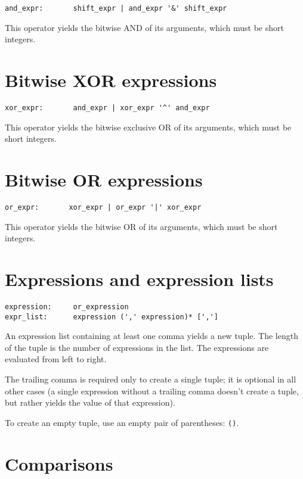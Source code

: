 \begin{verbatim}
and_expr:       shift_expr | and_expr '&' shift_expr
\end{verbatim}

This operator yields the bitwise AND of its arguments,
which must be short integers.

\section{Bitwise XOR expressions}

\begin{verbatim}
xor_expr:       and_expr | xor_expr '^' and_expr
\end{verbatim}

This operator yields the bitwise exclusive OR of its arguments,
which must be short integers.

\section{Bitwise OR expressions}

\begin{verbatim}
or_expr:       xor_expr | or_expr '|' xor_expr
\end{verbatim}

This operator yields the bitwise OR of its arguments,
which must be short integers.

\section{Expressions and expression lists}

\begin{verbatim}
expression:     or_expression
expr_list:      expression (',' expression)* [',']
\end{verbatim}

An expression list containing at least one comma yields a new tuple.
The length of the tuple is the number of expressions in the list.
The expressions are evaluated from left to right.

The trailing comma is required only to create a single tuple;
it is optional in all other cases (a single expression without
a trailing comma doesn't create a tuple, but rather yields the
value of that expression).

To create an empty tuple, use an empty pair of parentheses: \verb/()/.

\section{Comparisons}

